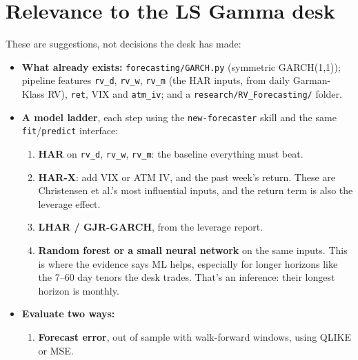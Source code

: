 \documentclass{article}
\begin{document}
\section{Relevance to the LS Gamma desk}

These are suggestions, not decisions the desk has made:

\begin{itemize}

\item \textbf{What already exists:} \texttt{forecasting/\allowbreak{}GARCH.\allowbreak{}py} (symmetric GARCH(1,1)); pipeline features \texttt{rv\_\allowbreak{}d}, \texttt{rv\_\allowbreak{}w}, \texttt{rv\_\allowbreak{}m} (the HAR inputs, from daily Garman-Klass RV), \texttt{ret}, VIX and \texttt{atm\_\allowbreak{}iv}; and a \texttt{research/\allowbreak{}RV\_\allowbreak{}Forecasting/\allowbreak{}} folder.

\item \textbf{A model ladder}, each step using the \texttt{new-\allowbreak{}forecaster} skill and the same \texttt{fit}/\allowbreak{}\texttt{predict} interface:

\begin{enumerate}

\item \textbf{HAR} on \texttt{rv\_\allowbreak{}d}, \texttt{rv\_\allowbreak{}w}, \texttt{rv\_\allowbreak{}m}: the baseline everything must beat.

\item \textbf{HAR-X}: add VIX or ATM IV, and the past week's return. These are Christensen et al.'s most influential inputs, and the return term is also the leverage effect.

\item \textbf{LHAR /\allowbreak{} GJR-GARCH}, from the leverage report.

\item \textbf{Random forest or a small neural network} on the same inputs. This is where the evidence says ML helps, especially for longer horizons like the 7--60 day tenors the desk trades. That's an inference: their longest horizon is monthly.

\end{enumerate}

\item \textbf{Evaluate two ways:}

\begin{enumerate}

\item \textbf{Forecast error}, out of sample with walk-forward windows, using QLIKE or MSE.


\end{enumerate}
\end{itemize}
\end{document}
